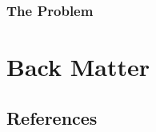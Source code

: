 \documentclass[
  letterpaper,
]{book}
\begin{document}
\hypertarget{the-problem-1}{%
\section{The Problem}\label{the-problem-1}}

\part{Back Matter}

\hypertarget{references}{%
\chapter*{References}\label{references}}

\end{document}
